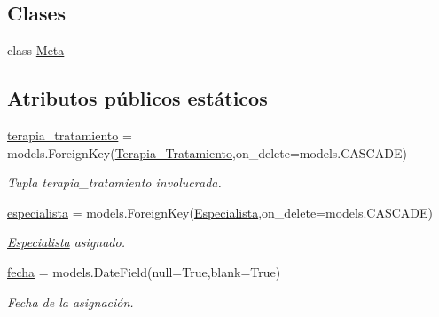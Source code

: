 \subsection*{Clases}
\begin{DoxyCompactItemize}
\item 
class \hyperlink{classappEmotionIOT_1_1models_1_1Especialista__Terapia__Tratamiento_1_1Meta}{Meta}
\end{DoxyCompactItemize}
\subsection*{Atributos públicos estáticos}
\begin{DoxyCompactItemize}
\item 
\hyperlink{classappEmotionIOT_1_1models_1_1Especialista__Terapia__Tratamiento_afac2334022e468701c8755b35a2c8cea}{terapia\+\_\+tratamiento} = models.\+Foreign\+Key(\hyperlink{classappEmotionIOT_1_1models_1_1Terapia__Tratamiento}{Terapia\+\_\+\+Tratamiento},on\+\_\+delete=models.\+C\+A\+S\+C\+A\+DE)\hypertarget{classappEmotionIOT_1_1models_1_1Especialista__Terapia__Tratamiento_afac2334022e468701c8755b35a2c8cea}{}\label{classappEmotionIOT_1_1models_1_1Especialista__Terapia__Tratamiento_afac2334022e468701c8755b35a2c8cea}

\begin{DoxyCompactList}\small\item\em Tupla terapia\+\_\+tratamiento involucrada. \end{DoxyCompactList}\item 
\hyperlink{classappEmotionIOT_1_1models_1_1Especialista__Terapia__Tratamiento_ae2de30c50c974691c85486733dfda31a}{especialista} = models.\+Foreign\+Key(\hyperlink{classappEmotionIOT_1_1models_1_1Especialista}{Especialista},on\+\_\+delete=models.\+C\+A\+S\+C\+A\+DE)\hypertarget{classappEmotionIOT_1_1models_1_1Especialista__Terapia__Tratamiento_ae2de30c50c974691c85486733dfda31a}{}\label{classappEmotionIOT_1_1models_1_1Especialista__Terapia__Tratamiento_ae2de30c50c974691c85486733dfda31a}

\begin{DoxyCompactList}\small\item\em \hyperlink{classappEmotionIOT_1_1models_1_1Especialista}{Especialista} asignado. \end{DoxyCompactList}\item 
\hyperlink{classappEmotionIOT_1_1models_1_1Especialista__Terapia__Tratamiento_a6af60a992bc306363111d046e984e95c}{fecha} = models.\+Date\+Field(null=True,blank=True)\hypertarget{classappEmotionIOT_1_1models_1_1Especialista__Terapia__Tratamiento_a6af60a992bc306363111d046e984e95c}{}\label{classappEmotionIOT_1_1models_1_1Especialista__Terapia__Tratamiento_a6af60a992bc306363111d046e984e95c}

\begin{DoxyCompactList}\small\item\em Fecha de la asignación. \end{DoxyCompactList}\end{DoxyCompactItemize}


